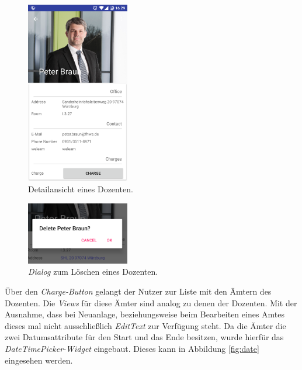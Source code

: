 \begin{figure}[H]
	\begin{center}
		\includegraphics[width=0.4\textwidth]{images/detail.png}
		\caption{Detailansicht eines Dozenten.}
		\label{fig:detail_view}
	\end{center}
\end{figure}

\begin{figure}[H]
	\begin{center}
		\includegraphics[width=0.4\textwidth]{images/dialog.png}
		\caption{\textit{Dialog} zum Löschen eines Dozenten.}
		\label{fig:dialog}
	\end{center}
\end{figure}

Über den \textit{Charge-Button} gelangt der Nutzer zur Liste mit den Ämtern des Dozenten. Die \textit{Views} für diese Ämter sind analog zu denen der Dozenten. Mit der Ausnahme, dass bei Neuanlage, beziehungsweise beim Bearbeiten eines Amtes dieses mal nicht ausschließlich \textit{EditText} zur Verfügung steht. Da die Ämter die zwei Datumsattribute für den Start und das Ende besitzen, wurde hierfür das \textit{DateTimePicker-Widget} eingebaut. Dieses kann in Abbildung \ref{fig:date} eingesehen werden.


